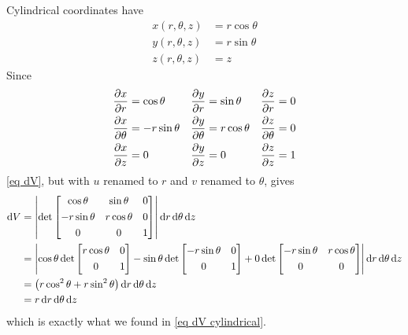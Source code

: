 \begin{eg}\label{eg cylindrical dV}
Cylindrical coordinates have
\begin{align*}
x(r,\theta,z) &= r\cos\theta \\
y(r,\theta,z) &= r\sin\theta \\
z(r,\theta,z) & = z
\end{align*}
Since
\begin{align*}
\pdiff{x}{r}&=\cos\theta   &\pdiff{y}{r}&=\sin\theta &\pdiff{z}{r}&=0 \\
\pdiff{x}{\theta}&=-r\sin\theta  &\pdiff{y}{\theta}&=r\cos\theta 
               &\pdiff{z}{\theta}&=0 \\
\pdiff{x}{z}&= 0  &\pdiff{y}{z}&=0
               &\pdiff{z}{z}&=1
\end{align*}
\eqref{eq dV}, but with $u$ renamed to $r$ and $v$ renamed to $\theta$, 
gives
\begin{align*}
\mathrm{d}V &= \left|\det\left[\begin{matrix}\cos\theta &\sin\theta&0 \\[0.05in] 
                                   -r\sin\theta & r\cos\theta&0 \\[0.05in] 
                                     0 & 0 & 1
       \end{matrix}\right]\right| \mathrm{d}r\,\mathrm{d}\theta\,\mathrm{d}z \\
&= \left|\cos\theta\det\left[\begin{matrix} 
                                            r\cos\theta&0 \\[0.05in] 
                                                0 & 1
                           \end{matrix}\right]
        -\sin\theta\det\left[\begin{matrix} 
                                            -r\sin\theta&0 \\[0.05in] 
                                                0 & 1
                           \end{matrix}\right]
        +0\det\left[\begin{matrix} 
                              -r\sin\theta  &  r\cos\theta \\[0.05in] 
                                                0 & 0
                           \end{matrix}\right]
    \right| \mathrm{d}r\,\mathrm{d}\theta\,\mathrm{d}z \\
   &=\big(r\cos^2\theta + r\sin^2\theta\big)\,\mathrm{d}r\,\mathrm{d}\theta\,\mathrm{d}z\\
  &= r\,\mathrm{d}r\,\mathrm{d}\theta\,\mathrm{d}z
\end{align*}
which is exactly what we found in \eqref{eq dV cylindrical}.
\end{eg}


